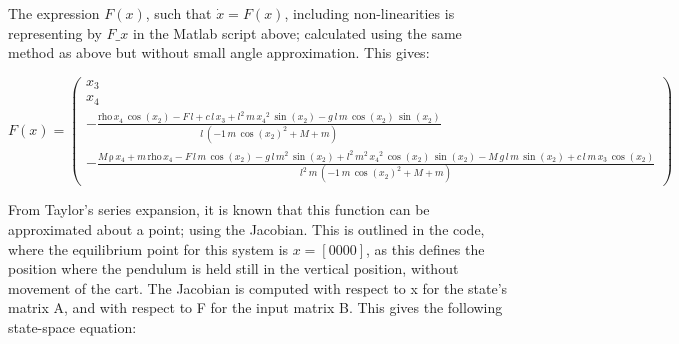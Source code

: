 \documentclass[12pt]{article}
\begin{document}
\vspace{\baselineskip}


\vspace{\baselineskip}



\vspace{\baselineskip}



The expression $F(x)$, such that $\dot{x} = F(x)$, including non-linearities is representing by $F\_x$ in the Matlab script above; calculated using the same method as above but without small angle approximation. This gives:

\vspace{\baselineskip}


$F(x) = \left(\begin{array}{c} x_{3}\\ x_{4}\\ -\frac{\mathrm{rho}\, x_{4}\, \cos\!\left(x_{2}\right) - F\, l + c\, l\, x_{3} + l^2\, m\, {x_{4}}^2\, \sin\!\left(x_{2}\right) - g\, l\, m\, \cos\!\left(x_{2}\right)\, \sin\!\left(x_{2}\right)}{l\, \left( - 1\, m\, {\cos\!\left(x_{2}\right)}^2 + M + m\right)}\\ -\frac{M\, \mathrm{\rho}\, x_{4} + m\, \mathrm{rho}\, x_{4} - F\, l\, m\, \cos\!\left(x_{2}\right) - g\, l\, m^2\, \sin\!\left(x_{2}\right) + l^2\, m^2\, {x_{4}}^2\, \cos\!\left(x_{2}\right)\, \sin\!\left(x_{2}\right) - M\, g\, l\, m\, \sin\!\left(x_{2}\right) + c\, l\, m\, x_{3}\, \cos\!\left(x_{2}\right)}{l^2\, m\, \left( - 1\, m\, {\cos\!\left(x_{2}\right)}^2 + M + m\right)} \end{array}\right)$


\vspace{\baselineskip}


From Taylor's series expansion, it is known that this function can be approximated about a point; using the Jacobian. This is outlined in the code, where the equilibrium point for this system is $x = [0 0 0 0]$, as this defines the position where the pendulum is held still in the vertical position, without movement of the cart. The Jacobian is computed with respect to x for the state's matrix A, and with respect to F for the input matrix B. This gives the following state-space equation:


\vspace{\baselineskip}
\end{document}
